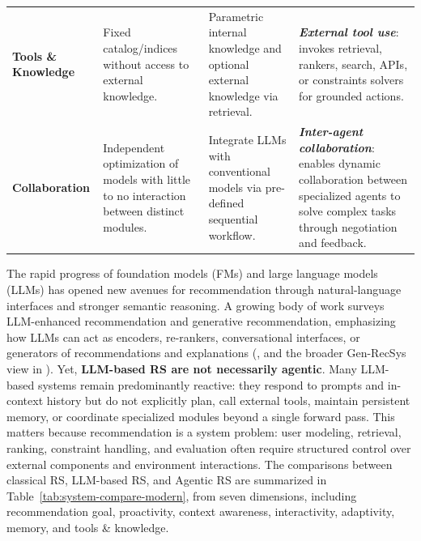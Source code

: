 \begin{table}[!t]
\begin{tabularx}{\textwidth}{@{}>{\bfseries}p{3.0cm} L L L@{}}
\textbf{Tools \& Knowledge}
& Fixed catalog/indices without access to external knowledge.
& Parametric internal knowledge and optional external knowledge via retrieval. 
& \textbf{\emph{External tool use}}: invokes retrieval, rankers, search, APIs, or constraints solvers for grounded actions. \\
\textbf{Collaboration}
& Independent optimization of models with little to no interaction between distinct modules.
& Integrate LLMs with conventional models via pre-defined sequential workflow.
& \textbf{\emph{Inter-agent collaboration}}: enables dynamic collaboration between specialized agents to solve complex tasks through negotiation and feedback. \\
\bottomrule
\end{tabularx}
\end{table}


The rapid progress of foundation models (FMs) and large language models (LLMs) has opened new avenues for recommendation through natural-language interfaces and stronger semantic reasoning.
A growing body of work surveys LLM-enhanced recommendation and generative recommendation, emphasizing how LLMs can act as encoders, re-rankers, conversational interfaces, or generators of recommendations and explanations
(\eg \citet{wu2024survey,zhao2024recommender,li2024large}, and the broader Gen-RecSys view in \citet{deldjoo2024recommendation,deldjoo2024review}).
Yet, \textbf{LLM-based RS are not necessarily agentic}.
Many LLM-based systems remain predominantly reactive: they respond to prompts and in-context history but do not explicitly plan, call external tools, maintain persistent memory, or coordinate specialized modules beyond a single forward pass.
This matters because recommendation is a system problem: user modeling, retrieval, ranking, constraint handling, and evaluation often require structured control over external components and environment interactions. 
The comparisons between classical RS, LLM-based RS, and Agentic RS are summarized in Table~\ref{tab:system-compare-modern}, from seven dimensions, including recommendation goal, proactivity, context awareness, interactivity, adaptivity, memory, and tools \& knowledge. 

